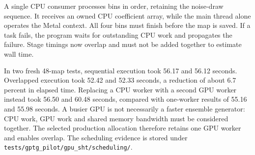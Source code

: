 A single CPU consumer processes bins in order, retaining the noise-draw
sequence. It receives an owned CPU coefficient array, while the main
thread alone operates the Metal context. All four bins must finish before
the map is saved. If a task fails, the program waits for outstanding CPU
work and propagates the failure. Stage timings now overlap and must not
be added together to estimate wall time.

In two fresh 48-map tests, sequential execution took 56.17 and 56.12
seconds. Overlapped execution took 52.42 and 52.33 seconds, a reduction
of about 6.7 percent in elapsed time. Replacing a CPU worker with a second
GPU worker instead took 56.50 and 60.48 seconds, compared with one-worker
results of 55.16 and 55.98 seconds. A busier GPU is not necessarily a
faster ensemble generator: CPU work, GPU work and shared memory bandwidth
must be considered together. The selected production allocation therefore
retains one GPU worker and enables overlap. The scheduling evidence is
stored under \texttt{tests/gptg\_pilot/gpu\_sht/scheduling/}.
